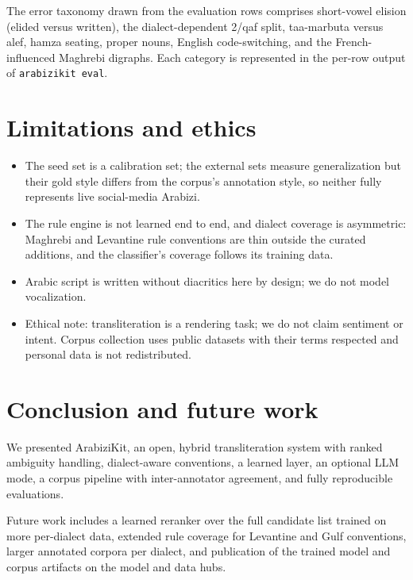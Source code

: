 \documentclass[11pt]{article}
\newcommand{\az}[1]{\texttt{#1}}
\begin{document}
The error taxonomy drawn from the evaluation rows comprises short-vowel
elision (elided versus written), the dialect-dependent 2/qaf split,
taa-marbuta versus alef, hamza seating, proper nouns, English
code-switching, and the French-influenced Maghrebi digraphs. Each
category is represented in the per-row output of \az{arabizikit eval}.

\section{Limitations and ethics}
\label{sec:limits}

\begin{itemize}
  \item The seed set is a calibration set; the external sets measure
        generalization but their gold style differs from the corpus's
        annotation style, so neither fully represents live social-media
        Arabizi.
  \item The rule engine is not learned end to end, and dialect coverage
        is asymmetric: Maghrebi and Levantine rule conventions are thin
        outside the curated additions, and the classifier's coverage
        follows its training data.
  \item Arabic script is written without diacritics here by design; we
        do not model vocalization.
  \item Ethical note: transliteration is a rendering task; we do not
        claim sentiment or intent. Corpus collection uses public datasets
        with their terms respected and personal data is not
        redistributed.
\end{itemize}

\section{Conclusion and future work}
\label{sec:conclusion}

We presented ArabiziKit, an open, hybrid transliteration system with
ranked ambiguity handling, dialect-aware conventions, a learned layer,
an optional LLM mode, a corpus pipeline with inter-annotator agreement,
and fully reproducible evaluations.

Future work includes a learned reranker over the full candidate list
trained on more per-dialect data, extended rule coverage for Levantine
and Gulf conventions, larger annotated corpora per dialect, and
publication of the trained model and corpus artifacts on the model and
data hubs.
\end{document}
